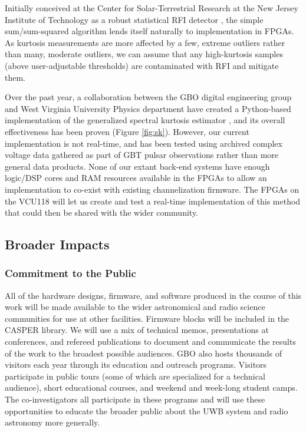 \documentclass[10pt]{myNSF}
\begin{document}
 Initially conceived at the Center for
Solar-Terrestrial Research at the New Jersey Institute of Technology
as a robust statistical RFI detector \citep{ng10,nhmg16}, the simple
sum/sum-squared algorithm lends itself naturally to implementation in
FPGAs.  As kurtosis measurements are more affected by a few, extreme
outliers rather than many, moderate outliers, we can assume that any
high-kurtosis samples (above user-adjustable thresholds) are
contaminated with RFI and mitigate them.

Over the past year, a collaboration between the GBO digital
engineering group and West Virginia University Physics department have
created a Python-based implementation of the generalized spectral
kurtosis estimator \citep{ng10}, and its overall effectiveness has
been proven (Figure \ref{fig:sk}).  However, our current
implementation is not real-time, and has been tested using archived
complex voltage data gathered as part of GBT pulsar observations
rather than more general data products.  None of our extant back-end
systems have enough logic/DSP cores and RAM resources available in the
FPGAs to allow an implementation to co-exist with existing
channelization firmware.  The FPGAs on the VCU118 will let us create
and test a real-time implementation of this method that could then be
shared with the wider community.

\subsection{Broader Impacts}
\label{sec:BI}

\subsubsection{Commitment to the Public}
\label{sec:commitment}

All of the hardware designs, firmware, and software produced in the
course of this work will be made available to the wider astronomical
and radio science communities for use at other facilities.  Firmware
blocks will be included in the CASPER library.  We will use a mix of
technical memos, presentations at conferences, and refereed
publications to document and communicate the results of the work to
the broadest possible audiences.  GBO also hosts thousands of visitors
each year through its education and outreach programs.  Visitors
participate in public tours (some of which are specialized for a
technical audience), short educational courses, and weekend and
week-long student camps.  The co-investigators all participate in
these programs and will use these opportunities to educate the broader
public about the UWB system and radio astronomy more generally.
\end{document}

